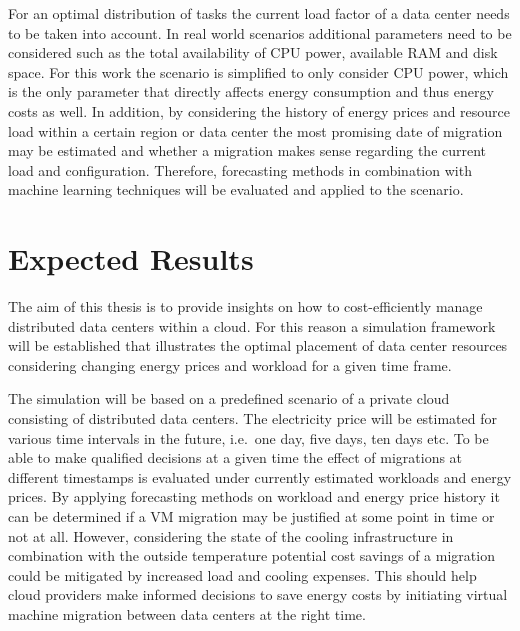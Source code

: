 \documentclass[a4paper]{article}
\begin{document}
For an optimal distribution of tasks the current load factor of a data center needs to be taken into account. In real world scenarios additional parameters need to be considered such as the total availability of CPU power, available RAM and disk space. For this work the scenario is simplified to only consider CPU power, which is the only parameter that directly affects energy consumption and thus energy costs as well. In addition, by considering the history of energy prices and resource load within a certain region or data center the most promising date of migration may be estimated and whether a migration makes sense regarding the current load and configuration. Therefore, forecasting methods in combination with machine learning techniques will be evaluated and applied to the scenario. 



\section{Expected Results}

The aim of this thesis is to provide insights on how to cost-efficiently manage distributed data centers within a cloud. For this reason a simulation framework will be established that illustrates the optimal placement of data center resources considering changing energy prices and workload for a given time frame. 

The simulation will be based on a predefined scenario of a private cloud consisting of distributed data centers. The electricity price will be estimated for various time intervals in the future, i.e.\ one day, five days, ten days etc. To be able to make qualified decisions at a given time the effect of migrations at different timestamps is evaluated under currently estimated workloads and energy prices. By applying forecasting methods on workload and energy price history it can be determined if a VM migration may be justified at some point in time or not at all. However, considering the state of the cooling infrastructure in combination with the outside temperature potential cost savings of a migration could be mitigated by increased load and cooling expenses. This should help cloud providers make informed decisions to save energy costs by initiating virtual machine migration between data centers at the right time. 

\end{document}
